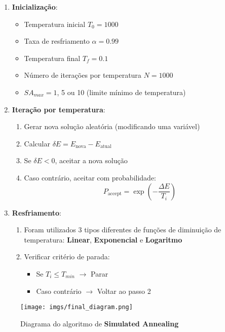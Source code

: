 \documentclass[12pt]{article}
\begin{document}
\begin{enumerate}
    \item \textbf{Inicialização}:
    \begin{itemize}
        \item Temperatura inicial $T_0 = 1000$
        \item Taxa de resfriamento $\alpha = 0.99$
        \item Temperatura final $T_f = 0.1$
        \item Número de iterações por temperatura $N = 1000$
        \item $SA_{max} = 1$, 5 ou 10 (limite mínimo de temperatura)
    \end{itemize}
    
    \item \textbf{Iteração por temperatura}:
    \begin{enumerate}
        \item Gerar nova solução aleatória (modificando uma variável)
        \item Calcular $\delta E = E_{\text{nova}} - E_{\text{atual}}$
        \item Se $\delta E < 0$, aceitar a nova solução
        \item Caso contrário, aceitar com probabilidade:
        \begin{equation}
            P_{\text{accept}} = \exp\left(-\frac{\Delta E}{T_i}\right)
            \label{eq:probabilidade}
        \end{equation}
    \end{enumerate}
    
    \item \textbf{Resfriamento}:
    \begin{enumerate}
      \item Foram utilizados 3 tipos diferentes de funções de diminuição de temperatura: \textbf{Linear}, \textbf{Exponencial} e \textbf{Logaritmo}
      \item Verificar critério de parada:
        \begin{itemize}
            \item Se $T_i \leq T_{min}$ $\rightarrow$ Parar
            \item Caso contrário $\rightarrow$ Voltar ao passo 2
        \end{itemize}
    \end{enumerate}
\end{enumerate}

\begin{figure}[H]
    \centering
    \texttt{[image: imgs/final\_diagram.png]}
    \caption{Diagrama do algoritmo de \textbf{Simulated Annealing}}
    \label{fig:metodologia}
\end{figure}
\end{document}

